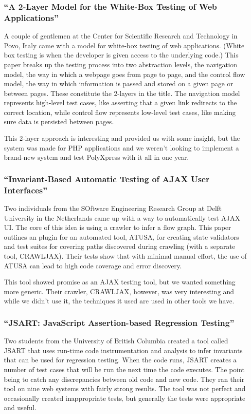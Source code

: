 \documentclass[11pt]{article}
\begin{document}
\subsubsection{``A 2-Layer Model for the White-Box Testing of Web Applications'' \cite{2LayerModel}}
A couple of gentlemen at the Center for Scientific Research and Technology in Povo, Italy came with a model for white-box testing of web applications. (White box testing is when the developer is given access to the underlying code.) This paper breaks up the testing process into two abstraction levels, the navigation model, the way in which a webpage goes from page to page, and the control flow model, the way in which information is passed and stored on a given page or between pages. These constitute the 2-layers in the title. The navigation model represents high-level test cases, like asserting that a given link redirects to the correct location, while control flow represents low-level test cases, like making sure data is persisted between pages. 

This 2-layer approach is interesting and provided us with some insight, but the system was made for PHP applications and we weren't looking to implement a brand-new system and test PolyXpress with it all in one year.

\subsubsection{``Invariant-Based Automatic Testing of AJAX User Interfaces'' \cite{InvariantBasedUseInterfaces}}
Two individuals from the SOftware Engineering Research Group at Delft University in the Netherlands came up with a way to automatically test AJAX UI. The core of this idea is using a crawler to infer a flow graph. This paper outlines an plugin for an automated tool, ATUSA, for creating state validators and test suites for covering paths discovered during crawling (with a separate tool, CRAWLJAX). Their tests show that with minimal manual effort, the use of ATUSA can lead to high code coverage and error discovery. 

This tool showed promise as an AJAX testing tool, but we wanted something more generic. Their crawler, CRAWLJAX, however, was very interesting and while we didn't use it, the techniques it used are used in other tools we have.

\subsubsection{``JSART: JavaScript Assertion-based Regression Testing'' \cite{JSART}}
Two students from the University of British Columbia created a tool called JSART that uses run-time code instrumentation and analysis to infer invariants that can be used for regression testing. When the code runs, JSART creates a number of test cases that will be run the next time the code executes. The point being to catch any discrepancies between old code and new code. They ran their tool on nine web systems with fairly strong results. The tool was not perfect and occasionally created inappropriate tests, but generally the tests were appropriate and useful.
\end{document}
